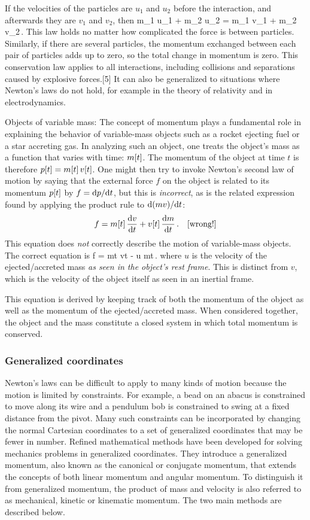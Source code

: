 If the velocities of the particles are $u_1$ and $u_2$ before the interaction, and afterwards they are $v_1$ and $v_2$, then
\beq
m_1 u_1 + m_2 u_2 = m_1 v_1 + m_2 v_2\,.
\eeq
This law holds no matter how complicated the force is between particles. Similarly, if there are several particles, the momentum exchanged between each pair of particles adds up to zero, so the total change in momentum is zero. This conservation law applies to all interactions, including collisions and separations caused by explosive forces.[5] It can also be generalized to situations where Newton's laws do not hold, for example in the theory of relativity and in electrodynamics.

Objects of variable mass: The concept of momentum plays a fundamental role in explaining the behavior of variable-mass objects such as a rocket ejecting fuel or a star accreting gas. In analyzing such an object, one treats the object's mass as a function that varies with time: $m\!\left[{t}\right]$. The momentum of the object at time $t$ is therefore $p\!\left[{t}\right] = m\!\left[{t}\right] v\!\left[{t}\right]$. One might then try to invoke Newton's second law of motion by saying that the external force $f$ on the object is related to its momentum $p\!\left[{t}\right]$ by $f = \text{d}p/\text{d} t$, but this is \emph{incorrect}, as is the related expression found by applying the product rule to $\text{d} (mv)/\text{d} t$:
\begin{align*}
f &= m\!\left[{t}\right] \dfrac{\text{d}{v}}{\text{d}{t}} + v\!\left[{t}\right] \dfrac{\text{d}{m}}{\text{d}{t}}\,.&\text{[{wrong!}]}
\end{align*}
This equation does \emph{not} correctly describe the motion of variable-mass objects. The correct equation is
\beq
f = m\vat t \xod vt - u \xod mt\,.
\eeq
where $u$ is the velocity of the ejected/accreted mass \emph{as seen in the object's rest frame}. This is distinct from $v$, which is the velocity of the object itself as seen in an inertial frame.

This equation is derived by keeping track of both the momentum of the object as well as the momentum of the ejected/accreted mass. When considered together, the object and the mass constitute a closed system in which total momentum is conserved.


\subsubsection{Generalized coordinates}
Newton's laws can be difficult to apply to many kinds of motion because the motion is limited by constraints. For example, a bead on an abacus is constrained to move along its wire and a pendulum bob is constrained to swing at a fixed distance from the pivot. Many such constraints can be incorporated by changing the normal Cartesian coordinates to a set of generalized coordinates that may be fewer in number. Refined mathematical methods have been developed for solving mechanics problems in generalized coordinates. They introduce a generalized momentum, also known as the canonical or conjugate momentum, that extends the concepts of both linear momentum and angular momentum. To distinguish it from generalized momentum, the product of mass and velocity is also referred to as mechanical, kinetic or kinematic momentum. The two main methods are described below.

